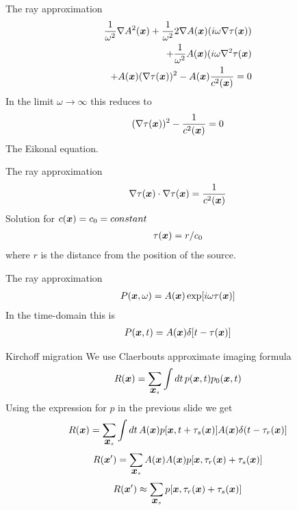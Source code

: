 \documentclass[xcolor=dvipsnames,notes]{beamer}
\begin{document}
\begin{frame}{The ray approximation}
\begin{eqnarray}
                             \frac{1}{\omega^2}\nabla A^2(\mbox{\boldmath $x$}) 
                              +  \frac{1}{\omega^2}2\nabla A(\mbox{\boldmath $x$})(i\omega\nabla\tau(\mbox{\boldmath $x$})) \nonumber\\
                              +  \frac{1}{\omega^2}A(\mbox{\boldmath $x$})(i\omega\nabla^2\tau(\mbox{\boldmath $x$})\nonumber\\      
                              +  A(\mbox{\boldmath $x$})(\nabla\tau(\mbox{\boldmath $x$}))^2-A(\mbox{\boldmath $x$})\frac{1}{c^2(\mbox{\boldmath $x$})} = 0\nonumber\\
\end{eqnarray}
In the limit $\omega \rightarrow \infty$ this reduces to
\begin{eqnarray}
                              (\nabla\tau(\mbox{\boldmath $x$}))^2-\frac{1}{c^2(\mbox{\boldmath $x$})} = 0
\end{eqnarray}
The Eikonal equation.
\end{frame}
\begin{frame}{The ray approximation}
\begin{eqnarray}
\nabla\tau(\mbox{\boldmath $x$}) \cdot \nabla\tau(\mbox{\boldmath $x$}) = \frac{1}{c^2(\mbox{\boldmath $x$})}
\end{eqnarray}
Solution for $c(\mbox{\boldmath $x$}) = c_0=constant$
\begin{eqnarray}
\tau(\mbox{\boldmath $x$}) = r/c_0
\end{eqnarray}
where $r$ is the distance from the position of the source.
\end{frame}
\begin{frame}{The ray approximation}
\begin{eqnarray}
P(\mbox{\boldmath $x$},\omega) = A(\mbox{\boldmath $x$}) \exp[i\omega\tau(\mbox{\boldmath $x$})]
\end{eqnarray}
In the time-domain this is
\begin{eqnarray}
P(\mbox{\boldmath $x$},t) = A(\mbox{\boldmath $x$}) \delta[t-\tau(\mbox{\boldmath $x$})]
\end{eqnarray}
\end{frame}
\begin{frame}{Kirchoff migration}
We use Claerbouts approximate imaging formula
\begin{eqnarray}
R(\mbox{\boldmath $x$}) = \sum_{\mbox{\boldmath $x$}_s} \int dt\, p(\mbox{\boldmath $x$},t)p_0(\mbox{\boldmath $x$},t)
\end{eqnarray}
Using the expression for $p$ in the
previous slide we get
\begin{eqnarray}
R(\mbox{\boldmath $x$}) = \sum_{\mbox{\boldmath $x$}_s} \int dt\, A(\mbox{\boldmath $x$})p[\mbox{\boldmath $x$},t+\tau_s(\mbox{\boldmath $x$})]A(\mbox{\boldmath $x$})\delta(t-\tau_r(\mbox{\boldmath $x$})]
\end{eqnarray}
\begin{eqnarray}
R(\mbox{\boldmath $x$}') = \sum_{\mbox{\boldmath $x$}_s} A(\mbox{\boldmath $x$})A(\mbox{\boldmath $x$}) p[\mbox{\boldmath $x$},\tau_r(\mbox{\boldmath $x$})+\tau_s(\mbox{\boldmath $x$})]
\end{eqnarray}
\begin{eqnarray}
R(\mbox{\boldmath $x$}') \approx \sum_{\mbox{\boldmath $x$}_s} p[\mbox{\boldmath $x$},\tau_r(\mbox{\boldmath $x$})+\tau_s(\mbox{\boldmath $x$})]
\end{eqnarray}
\end{frame}
\end{document}
